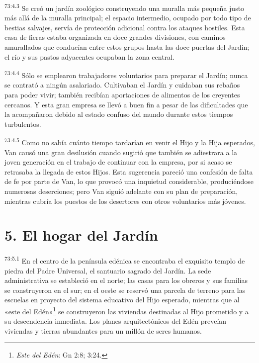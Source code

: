 \par
\textsuperscript{73:4.3} Se creó un jardín zoológico construyendo una muralla más pequeña justo más allá de la muralla principal; el espacio intermedio, ocupado por todo tipo de bestias salvajes, servía de protección adicional contra los ataques hostiles. Esta casa de fieras estaba organizada en doce grandes divisiones, con caminos amurallados que conducían entre estos grupos hasta las doce puertas del Jardín; el río y sus pastos adyacentes ocupaban la zona central.

\par
\textsuperscript{73:4.4} Sólo se emplearon trabajadores voluntarios para preparar el Jardín; nunca se contrató a ningún asalariado. Cultivaban el Jardín y cuidaban sus rebaños para poder vivir; también recibían aportaciones de alimentos de los creyentes cercanos. Y esta gran empresa se llevó a buen fin a pesar de las dificultades que la acompañaron debido al estado confuso del mundo durante estos tiempos turbulentos.

\par
\textsuperscript{73:4.5} Como no sabía cuánto tiempo tardarían en venir el Hijo y la Hija esperados, Van causó una gran desilusión cuando sugirió que también se adiestrara a la joven generación en el trabajo de continuar con la empresa, por si acaso se retrasaba la llegada de estos Hijos. Esta sugerencia pareció una confesión de falta de fe por parte de Van, lo que provocó una inquietud considerable, produciéndose numerosas deserciones; pero Van siguió adelante con su plan de preparación, mientras cubría los puestos de los desertores con otros voluntarios más jóvenes.

\section*{5. El hogar del Jardín}
\par
\textsuperscript{73:5.1} En el centro de la península edénica se encontraba el exquisito templo de piedra del Padre Universal, el santuario sagrado del Jardín. La sede administrativa se estableció en el norte; las casas para los obreros y sus familias se construyeron en el sur; en el oeste se reservó una parcela de terreno para las escuelas en proyecto del sistema educativo del Hijo esperado, mientras que al «este del Edén»\footnote{\textit{Este del Edén}: Gn 2:8; 3:24.} se construyeron las viviendas destinadas al Hijo prometido y a su descendencia inmediata. Los planes arquitectónicos del Edén preveían viviendas y tierras abundantes para un millón de seres humanos.

